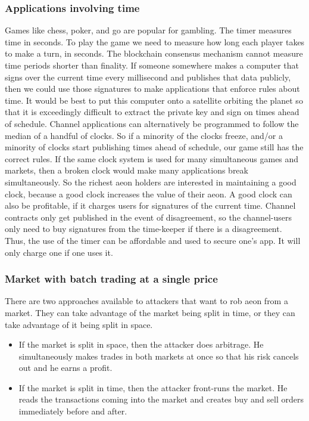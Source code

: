 \documentclass[a4paper, 10pt, conference]{ieeeconf}      %
\begin{document}
\begin{sketch}
\subsubsection{Applications involving time}
Games like chess, poker, and go are popular for gambling. The timer measures time in seconds. To play the game we need to measure how long each player takes to make a turn, in seconds.
The blockchain consensus mechanism cannot measure time periods shorter than finality.
If someone somewhere makes a computer that signs over the current time every millisecond and publishes that data publicly, then we could use those signatures to make applications that enforce rules about time.
It would be best to put this computer onto a satellite orbiting the planet so that it is exceedingly difficult to extract the private key and sign on times ahead of schedule.
Channel applications can alternatively be programmed to follow the median of a handful of clocks. So if a minority of the clocks freeze, and/or a minority of clocks start publishing times ahead of schedule, our game still has the correct rules.
If the same clock system is used for many simultaneous games and markets, then a broken clock would make many applications break simultaneously. So the richest aeon holders are interested in maintaining a good clock, because a good clock increases the value of their aeon.
A good clock can also be profitable, if it charges users for signatures of the current time.
Channel contracts only get published in the event of disagreement, so the channel-users only need to buy signatures from the time-keeper if there is a disagreement. Thus, the use of the timer can be affordable and used to secure one's app. It will only charge one if one uses it.
\fi

\begin{draft}
\subsubsection{Market with batch trading at a single price}
There are two approaches available to attackers that want to rob aeon from a market. They can take advantage of the market being split in time, or they can take advantage of it being split in space.

\begin{itemize} 
   \item If the market is split in space, then the attacker does arbitrage. He simultaneously makes trades in both markets at once so that his risk cancels out and he earns a profit.
   \item If the market is split in time, then the attacker front-runs the market. He reads the transactions coming into the market and creates buy and sell orders immediately before and after.
\end{itemize}



\end{draft}
\end{sketch}
\end{document}
